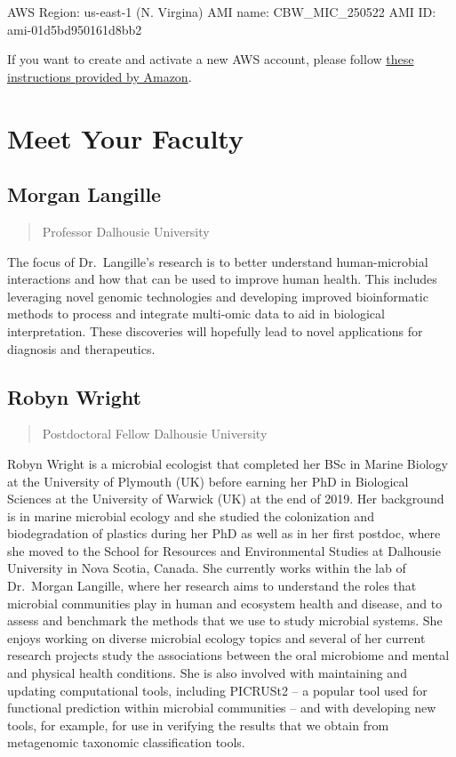 \documentclass[
]{book}
\begin{document}
AWS Region: us-east-1 (N. Virgina)
AMI name: CBW\_MIC\_250522
AMI ID: ami-01d5bd950161d8bb2

If you want to create and activate a new AWS account, please follow \href{https://aws.amazon.com/premiumsupport/knowledge-center/create-and-activate-aws-account/}{these instructions provided by Amazon}.

\section{Meet Your Faculty}\label{meet-your-faculty}

\subsection{Morgan Langille}\label{morgan-langille}

\begin{quote}
Professor
Dalhousie University
\end{quote}

The focus of Dr.~Langille's research is to better understand human-microbial interactions and how that can be used to improve human health. This includes leveraging novel genomic technologies and developing improved bioinformatic methods to process and integrate multi-omic data to aid in biological interpretation. These discoveries will hopefully lead to novel applications for diagnosis and therapeutics.

\subsection{Robyn Wright}\label{robyn-wright}

\begin{quote}
Postdoctoral Fellow
Dalhousie University
\end{quote}

Robyn Wright is a microbial ecologist that completed her BSc in Marine Biology at the University of Plymouth (UK) before earning her PhD in Biological Sciences at the University of Warwick (UK) at the end of 2019. Her background is in marine microbial ecology and she studied the colonization and biodegradation of plastics during her PhD as well as in her first postdoc, where she moved to the School for Resources and Environmental Studies at Dalhousie University in Nova Scotia, Canada. She currently works within the lab of Dr.~Morgan Langille, where her research aims to understand the roles that microbial communities play in human and ecosystem health and disease, and to assess and benchmark the methods that we use to study microbial systems. She enjoys working on diverse microbial ecology topics and several of her current research projects study the associations between the oral microbiome and mental and physical health conditions. She is also involved with maintaining and updating computational tools, including PICRUSt2 -- a popular tool used for functional prediction within microbial communities -- and with developing new tools, for example, for use in verifying the results that we obtain from metagenomic taxonomic classification tools.
\end{document}
